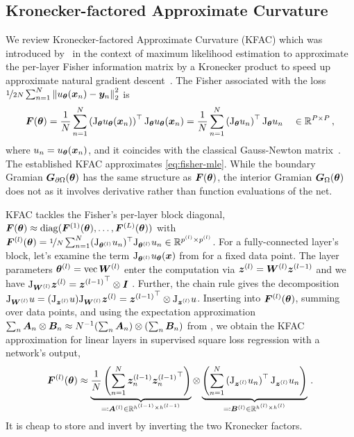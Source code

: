 \subsection{Kronecker-factored Approximate Curvature}

We review Kronecker-factored Approximate Curvature (KFAC) which was introduced by~\citet{heskes2000natural, martens2015optimizing} in the context of maximum likelihood estimation to approximate the per-layer Fisher information matrix by a Kronecker product to speed up approximate natural gradient descent~\cite{amari1998natural}.
The Fisher associated with the loss $\nicefrac{1}{2N} \sum_{n=1}^N \left\lVert u_{\bm{\theta}}({\bm{x}}_n) - {\bm{y}}_n \right\rVert_2^2$ is
\begin{equation}\label{eq:fisher-mle}
  {\bm{F}}({\bm{\theta}})
  =
  \frac{1}{N}
  \sum_{n=1}^N
  \left(\mathrm{J}_{{\bm{\theta}}} u_{{\bm{\theta}}}({\bm{x}}_n)  \right)^\top
  \mathrm{J}_{{\bm{\theta}}} u_{{\bm{\theta}}}({\bm{x}}_n)
  =
  \frac{1}{N}
  \sum_{n=1}^N
  \left( \mathrm{J}_{{\bm{\theta}}} u_n \right)^\top
  \mathrm{J}_{{\bm{\theta}}} u_n
  \quad\in {\mathbb{R}}^{P\times P}\,,
\end{equation}
where $u_n = u_{\bm{\theta}}({\bm{x}}_n)$, and it coincides with the classical Gauss-Newton matrix~\citep{martens2020new}.
The established KFAC approximates \eqref{eq:fisher-mle}.
While the boundary Gramian ${\bm{G}}_{\partial\Omega}({\bm{\theta}})$ has the same structure as ${\bm{F}}({\bm{\theta}})$, the interior Gramian ${\bm{G}}_\Omega({\bm{\theta}})$ does not as it involves derivative rather than function evaluations of the net.

KFAC tackles the Fisher's per-layer block diagonal, ${\bm{F}}({\bm{\theta}}) \approx \operatorname{diag}({\bm{F}}^{(1)}({\bm{\theta}}), \dots, {\bm{F}}^{(L)}({\bm{\theta}}))$ with ${\bm{F}}^{(l)}({\bm{\theta}}) = \nicefrac{1}{N} \sum_{n=1}^N (\mathrm{J}_{{\bm{\theta}}^{(l)}} u_n)^{\top} \mathrm{J}_{{\bm{\theta}}^{(l)}} u_n \in {\mathbb{R}}^{ p^{(l)} \times p^{(l)} }$.
For a fully-connected layer's block, let's examine the term $\mathrm{J}_{{\bm{\theta}}^{(l)}} u_{{\bm{\theta}}}({\bm{x}})$ from  for a fixed data point.
The layer parameters ${\bm{\theta}}^{(l)} = \operatorname{vec} {\bm{W}}^{(l)}$ enter the computation via ${\bm{z}}^{(l)} = {\bm{W}}^{(l)}{\bm{z}}^{(l-1)}$ and we have $\mathrm{J}_{{\bm{W}}^{(l)}} {\bm{z}}^{(l)} = {{\bm{z}}^{(l-1)}}^\top \otimes {\bm{I}}$ \citep[e.g.][]{dangel2020modular}.
Further, the chain rule gives the decomposition $\mathrm{J}_{{\bm{W}}^{(l)}} u = (\mathrm{J}_{{\bm{z}}^{(l)}} u) \mathrm{J}_{{\bm{W}}^{(l)}} {\bm{z}}^{(l)} = {{\bm{z}}^{(l-1)}}^\top\otimes \mathrm{J}_{{\bm{z}}^{(l)}} u$.
Inserting into ${\bm{F}}^{(l)}({\bm{\theta}})$, summing over data points, and using the expectation approximation $\sum_n {\bm{A}}_n \otimes {\bm{B}}_n \approx N^{-1}(\sum_n {\bm{A}}_n) \otimes (\sum_n {\bm{B}}_n)$ from \citet{martens2015optimizing}, we obtain the KFAC approximation for linear layers in supervised square loss regression with a network's output,
\begin{equation}\label{eq:kfac-linear}
  {\bm{F}}^{(l)}({\bm{\theta}})
  \approx
  \underbrace{
    \frac{1}{N}
    \left(\sum_{n=1}^N {\bm{z}}^{(l-1)}_n {{\bm{z}}^{(l-1)}_n}^\top \right)
  }_{\eqqcolon {\bm{A}}^{(l)} \in {\mathbb{R}}^{h^{(l-1)} \times h^{(l-1)}}}
  \otimes
  \underbrace{
    \left(\sum_{n=1}^N
      \left(\mathrm{J}_{{\bm{z}}^{(l)}}  u_n \right)^\top
      \mathrm{J}_{{\bm{z}}^{(l)}}  u_n
    \right)
  }_{\eqqcolon {\bm{B}}^{(l)} \in {\mathbb{R}}^{h^{(l)} \times h^{(l)} }}\,.
\end{equation}
It is cheap to store and invert by inverting the two Kronecker factors.

